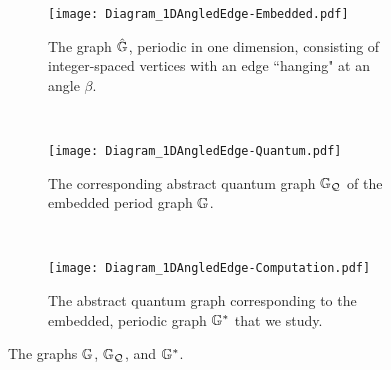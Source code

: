 \begin{figure}[b!]
	\centering
	\begin{subfigure}[t]{0.3\textwidth}
		\centering
		\texttt{[image: Diagram\_1DAngledEdge-Embedded.pdf]}
		\caption[]{\label{fig:Diagram_1DAngledEdge-Embedded} The graph $\hat{\mathbb{G}}$, periodic in one dimension, consisting of integer-spaced vertices with an edge ``hanging" at an angle $\beta$.}
	\end{subfigure}
	~
	\begin{subfigure}[t]{0.3\textwidth}
		\centering
		\texttt{[image: Diagram\_1DAngledEdge-Quantum.pdf]}
		\caption[]{\label{fig:Diagram_1DAngledEdge-Quantum} The corresponding abstract quantum graph $\mathbb{G}_{\mathcal{Q}}$ of the embedded period graph $\mathbb{G}$.}
	\end{subfigure}
	~
	\begin{subfigure}[t]{0.3\textwidth}
		\centering
		\texttt{[image: Diagram\_1DAngledEdge-Computation.pdf]}	
		\caption[]{\label{fig:Diagram_1DAngledEdge-Computation} The abstract quantum graph corresponding to the embedded, periodic graph $\mathbb{G}^*$ that we study.}
	\end{subfigure}
	\caption[The graph and period graph studied in the example of section \ref{ssec:EmbeddingDependentExample}.]{\label{fig:Diagram_1DAngledEdgeExample} The graphs $\mathbb{G}$, $\mathbb{G}_{\mathcal{Q}}$, and $\mathbb{G}^*$.}
\end{figure}

